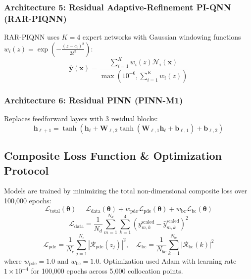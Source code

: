 \documentclass[3p,preprint,12pt,numbers,square,sort&compress]{elsarticle}
\begin{document}
\subsubsection{Architecture 5: Residual Adaptive-Refinement PI-QNN (RAR-PIQNN)}
RAR-PIQNN uses $K=4$ expert networks with Gaussian windowing functions $w_i(z) = \exp\left(-\frac{(z - c_i)^2}{2\delta^2}\right)$:
\begin{equation}
    \hat{\mathbf{y}}(\mathbf{x}) = \frac{\sum_{i=1}^{K} w_i(z) \mathcal{N}_i(\mathbf{x})}{\max\left(10^{-6}, \sum_{i=1}^{K} w_i(z)\right)}
\end{equation}

\subsubsection{Architecture 6: Residual PINN (PINN-M1)}
Replaces feedforward layers with 3 residual blocks:
\begin{equation}
    \mathbf{h}_{\ell+1} = \tanh\left(\mathbf{h}_\ell + \mathbf{W}_{\ell,2} \tanh\left(\mathbf{W}_{\ell,1} \mathbf{h}_\ell + \mathbf{b}_{\ell,1}\right) + \mathbf{b}_{\ell,2}\right)
\end{equation}

\subsection{Composite Loss Function \& Optimization Protocol}
Models are trained by minimizing the total non-dimensional composite loss over 100,000 epochs:
\begin{equation}
    \mathcal{L}_{\text{total}}(\boldsymbol{\theta}) = \mathcal{L}_{\text{data}}(\boldsymbol{\theta}) + w_{\text{pde}} \mathcal{L}_{\text{pde}}(\boldsymbol{\theta}) + w_{\text{bc}} \mathcal{L}_{\text{bc}}(\boldsymbol{\theta})
\end{equation}
\begin{equation}
    \mathcal{L}_{\text{data}} = \frac{1}{N_d} \sum_{m=1}^{N_d} \sum_{k=1}^4 \left( y_{m,k}^{\text{scaled}} - \hat{y}_{m,k}^{\text{scaled}} \right)^2
\end{equation}
\begin{equation}
    \mathcal{L}_{\text{pde}} = \frac{1}{N_c} \sum_{j=1}^{N_c} \left| \mathcal{R}_{\text{pde}}(z_j) \right|^2, \quad \mathcal{L}_{\text{bc}} = \frac{1}{N_{bc}} \sum_{k=1}^{N_{bc}} \left| \mathcal{R}_{\text{bc}}(k) \right|^2
\end{equation}
where $w_{\text{pde}} = 1.0$ and $w_{\text{bc}} = 1.0$. Optimization used Adam with learning rate $1 \times 10^{-4}$ for 100,000 epochs across 5,000 collocation points.
\end{document}
